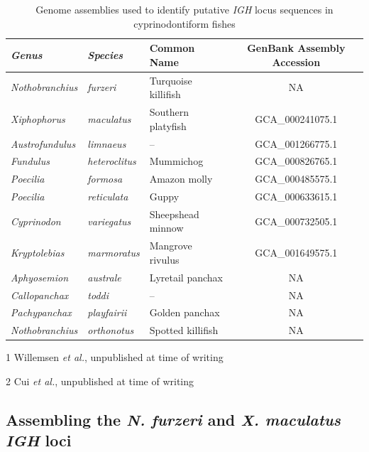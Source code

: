 \begin{table}
\centering
\caption{Genome assemblies used to identify putative \textit{IGH} locus sequences in cyprinodontiform fishes}
\begin{threeparttable}
\begin{tabular}{>{\itshape}l>{\itshape}llc}\toprule
\textnormal{\textbf{Genus}} & \textnormal{\textbf{Species}} & \textbf{Common Name} & \textbf{GenBank Assembly Accession}\\\midrule
Nothobranchius & furzeri & Turquoise killifish & NA\tnote{1}\\\midrule
Xiphophorus & maculatus & Southern platyfish & GCA\_000241075.1\\
Austrofundulus & limnaeus & -- & GCA\_001266775.1\\
Fundulus & heteroclitus & Mummichog & GCA\_000826765.1\\
Poecilia & formosa & Amazon molly & GCA\_000485575.1\\
Poecilia & reticulata & Guppy & GCA\_000633615.1\\
Cyprinodon & variegatus & Sheepshead minnow & GCA\_000732505.1\\
Kryptolebias & marmoratus & Mangrove rivulus & GCA\_001649575.1\\\midrule
Aphyosemion & australe & Lyretail panchax & NA\tnote{2}\\
Callopanchax & toddi & -- & NA\tnote{2}\\
Pachypanchax & playfairii & Golden panchax & NA\tnote{2}\\
Nothobranchius & orthonotus & Spotted killifish & NA\tnote{2}\\
\bottomrule\end{tabular}
	\begin{tablenotes}
	\item[1] Willemsen \textit{et al.}, unpublished at time of writing
	\item[2] Cui \textit{et al.}, unpublished at time of writing
	\end{tablenotes} %
\end{threeparttable}
\label{tab:cyprinodontiform_genomes}
\end{table}

\subsection{Assembling the \textit{N. furzeri} and \textit{X. maculatus} \textit{IGH} loci}
\label{sec:locus_assembly_methods}

